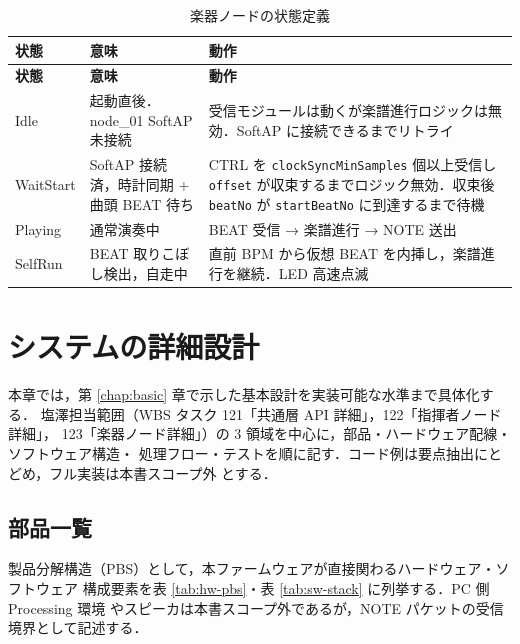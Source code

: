 \documentclass[lualatex,book,paper=a4paper,jafontsize=11.5pt,jafontscale=1.05]{jlreq}
\begin{document}
\begin{longtable}{p{} p{} p{}}
\caption{楽器ノードの状態定義}\label{tab:state-performer}\\
\toprule
\textbf{状態} & \textbf{意味} & \textbf{動作} \\
\midrule
\endfirsthead
\toprule
\textbf{状態} & \textbf{意味} & \textbf{動作} \\
\midrule
\endhead
Idle      & 起動直後．node\_01 SoftAP 未接続 & 受信モジュールは動くが楽譜進行ロジックは無効．SoftAP に接続できるまでリトライ \\
WaitStart & SoftAP 接続済，時計同期 + 曲頭 BEAT 待ち & CTRL を \texttt{clockSyncMinSamples} 個以上受信し \texttt{offset} が収束するまでロジック無効．収束後 \texttt{beatNo} が \texttt{startBeatNo} に到達するまで待機 \\
Playing   & 通常演奏中                 & BEAT 受信 → 楽譜進行 → NOTE 送出 \\
SelfRun   & BEAT 取りこぼし検出，自走中 & 直前 BPM から仮想 BEAT を内挿し，楽譜進行を継続．LED 高速点滅 \\
\bottomrule
\end{longtable}


\chapter{システムの詳細設計}\label{chap:detail}

本章では，第 \ref{chap:basic} 章で示した基本設計を実装可能な水準まで具体化する．
塩澤担当範囲（WBS タスク 121「共通層 API 詳細」，122「指揮者ノード詳細」，
123「楽器ノード詳細」）の 3 領域を中心に，部品・ハードウェア配線・ソフトウェア構造・
処理フロー・テストを順に記す．コード例は要点抽出にとどめ，フル実装は本書スコープ外
とする．


\section{部品一覧}\label{sec:parts-list}

製品分解構造（PBS）として，本ファームウェアが直接関わるハードウェア・ソフトウェア
構成要素を表 \ref{tab:hw-pbs}・表 \ref{tab:sw-stack} に列挙する．PC 側 Processing 環境
やスピーカは本書スコープ外であるが，NOTE パケットの受信境界として記述する．
\end{document}
